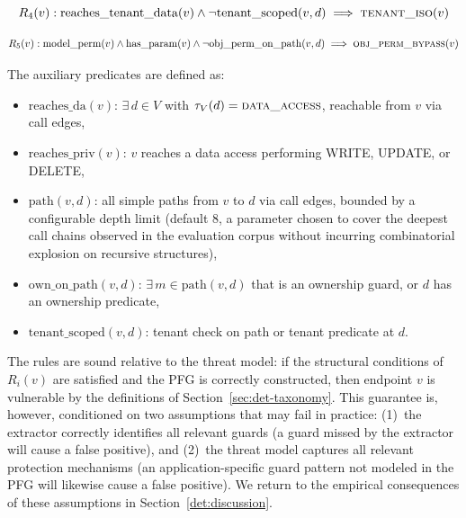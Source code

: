 \begin{definition}
\begin{equation}
R_4(v): \mathrm{reaches\_tenant\_data}(v) \wedge
\neg\mathrm{tenant\_scoped}(v,d) \implies \textsc{tenant\_iso}(v)
\end{equation}
\end{definition}

\begin{definition}
\begin{equation}
R_5(v): \mathrm{model\_perm}(v) \wedge \mathrm{has\_param}(v) \wedge
\neg\mathrm{obj\_perm\_on\_path}(v,d) \implies \textsc{obj\_perm\_bypass}(v)
\end{equation}
\end{definition}

The auxiliary predicates are defined as:
\begin{itemize}
    \item $\mathrm{reaches\_da}(v)$: $\exists\, d \in V$ with $\tau_V(d) =
    \textsc{data\_access}$, reachable from $v$ via call edges,
    \item $\mathrm{reaches\_priv}(v)$: $v$ reaches a data access performing
    WRITE, UPDATE, or DELETE,
    \item $\mathrm{path}(v,d)$: all simple paths from $v$ to $d$ via call
    edges, bounded by a configurable depth limit (default 8, a parameter
    chosen to cover the deepest call chains observed in the evaluation
    corpus without incurring combinatorial explosion on recursive
    structures),
    \item $\mathrm{own\_on\_path}(v,d)$: $\exists\, m \in \mathrm{path}(v,d)$
    that is an ownership guard, or $d$ has an ownership predicate,
    \item $\mathrm{tenant\_scoped}(v,d)$: tenant check on path or tenant
    predicate at $d$.
\end{itemize}

The rules are sound relative to the threat model: if the structural
conditions of $R_i(v)$ are satisfied and the PFG is correctly constructed,
then endpoint $v$ is vulnerable by the definitions of
Section~\ref{sec:det-taxonomy}. This guarantee is, however, conditioned on
two assumptions that may fail in practice: (1)~the extractor correctly
identifies all relevant guards (a guard missed by the extractor will cause a
false positive), and (2)~the threat model captures all relevant protection
mechanisms (an application-specific guard pattern not modeled in the PFG will
likewise cause a false positive). We return to the empirical consequences
of these assumptions in Section~\ref{det:discussion}.

